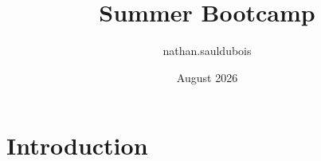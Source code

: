 \documentclass{article}
\title{Summer Bootcamp}
\author{nathan.sauldubois }
\date{August 2026}
\begin{document}
\maketitle

\section{Introduction}
\end{document}
